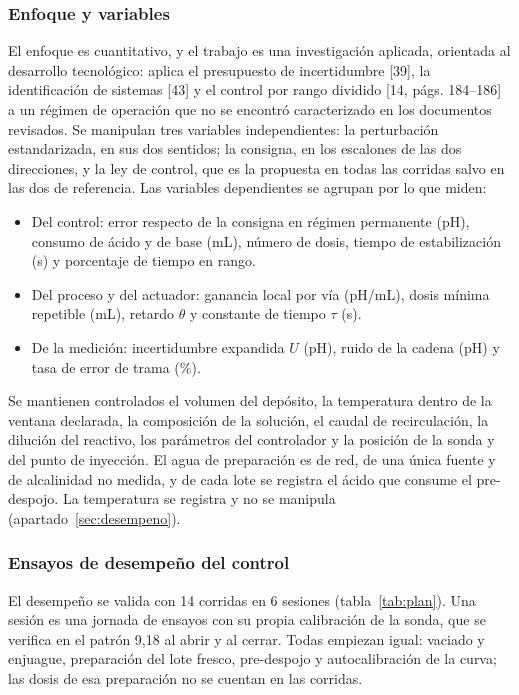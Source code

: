 \subsubsection{Enfoque y variables}\label{sec:variables}
El enfoque es cuantitativo, y el trabajo es una investigación aplicada, orientada al desarrollo tecnológico: aplica el presupuesto de incertidumbre [39], la identificación de sistemas [43] y el control por rango dividido [14, págs. 184–186] a un régimen de operación que no se encontró caracterizado en los documentos revisados. Se manipulan tres variables independientes: la perturbación estandarizada, en sus dos sentidos; la consigna, en los escalones de las dos direcciones, y la ley de control, que es la propuesta en todas las corridas salvo en las dos de referencia. Las variables dependientes se agrupan por lo que miden:
\begin{itemize}
\item Del control: error respecto de la consigna en régimen permanente (pH), consumo de ácido y de base (mL), número de dosis, tiempo de estabilización (s) y porcentaje de tiempo en rango.
\item Del proceso y del actuador: ganancia local por vía (pH/mL), dosis mínima repetible (mL), retardo $\theta$ y constante de tiempo $\tau$ (s).
\item De la medición: incertidumbre expandida $U$ (pH), ruido de la cadena (pH) y tasa de error de trama (\%).
\end{itemize}
Se mantienen controlados el volumen del depósito, la temperatura dentro de la ventana declarada, la composición de la solución, el caudal de recirculación, la dilución del reactivo, los parámetros del controlador y la posición de la sonda y del punto de inyección. El agua de preparación es de red, de una única fuente y de alcalinidad no medida, y de cada lote se registra el ácido que consume el pre-despojo. La temperatura se registra y no se manipula (apartado~\ref{sec:desempeno}).

\subsubsection{Ensayos de desempeño del control}\label{sec:ensayos}
El desempeño se valida con 14 corridas en 6 sesiones (tabla~\ref{tab:plan}). Una sesión es una jornada de ensayos con su propia calibración de la sonda, que se verifica en el patrón 9,18 al abrir y al cerrar. Todas empiezan igual: vaciado y enjuague, preparación del lote fresco, pre-despojo y autocalibración de la curva; las dosis de esa preparación no se cuentan en las corridas.

